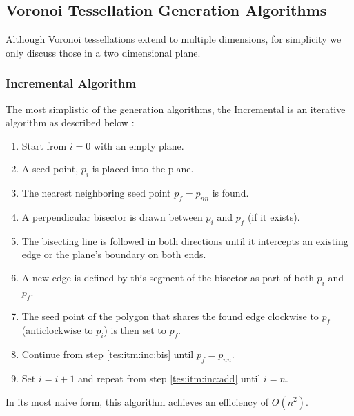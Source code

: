 \subsection{Voronoi Tessellation Generation Algorithms}\label{tes:sec:tga}
Although Voronoi tessellations extend to multiple dimensions, for simplicity we only discuss those in a two dimensional plane.
%
\subsubsection{Incremental Algorithm}\label{tes:ssec:inc}
The most simplistic of the generation algorithms, the Incremental is an iterative algorithm as described below \citep{green1978computing} \citep{okabe2009spatial}:
\begin{enumerate}
\item Start from $i=0$ with an empty plane.
\item\label{tes:itm:inc:add} A seed point, $p_i$ is placed into the plane.
\item The nearest neighboring seed point $p_f=p_{nn}$ is found.
\item\label{tes:itm:inc:bis} A perpendicular bisector is drawn between $p_i$ and $p_f$ (if it exists).
\item The bisecting line is followed in both directions until it intercepts an existing edge or the plane's boundary on both ends.
\item A new edge is defined by this segment of the bisector as part of both $p_i$ and $p_f$.
\item The seed point of the polygon that shares the found edge clockwise to $p_f$ (anticlockwise to $p_i$) is then set to $p_f$.
\item Continue from step \ref{tes:itm:inc:bis} until $p_f=p_{nn}$.
\item Set $i = i +1$ and repeat from step \ref{tes:itm:inc:add} until $i=n$.
\end{enumerate}
In its most naive form, this algorithm achieves an efficiency of $O(n^2)$.
%
